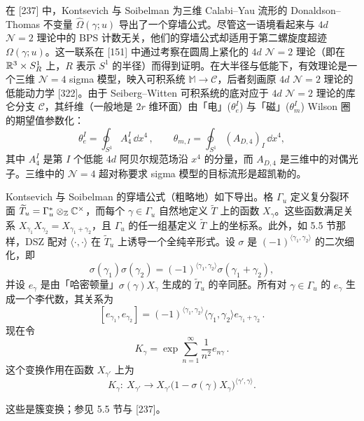 在 [237] 中，Kontsevich 与 Soibelman 为三维 Calabi–Yau 流形的 Donaldson–Thomas 不变量 $\widehat{\Omega}(\gamma;u)$ 导出了一个穿墙公式。尽管这一语境看起来与 $4d$ $\mathcal{N}=2$ 理论中的 BPS 计数无关，他们的穿墙公式却适用于第二螺旋度超迹 $\Omega(\gamma;u)$。这一联系在 [151] 中通过考察在圆周上紧化的 $4d$ $\mathcal{N}=2$ 理论（即在 $\mathbb{R}^3\times S^1_R$ 上，$R$ 表示 $S^1$ 的半径）而得到证明。在大半径与低能下，有效理论是一个三维 $\mathcal{N}=4$ sigma 模型，映入可积系统 $\mathbb{M}\to\mathcal{C}$，后者刻画原 $4d$ $\mathcal{N}=2$ 理论的低能动力学 [322]。由于 Seiberg–Witten 可积系统的底对应于 $4d$ $\mathcal{N}=2$ 理论的库仑分支 $\mathcal{C}$，其纤维（一般地是 $2r$ 维环面）由「电」($\theta_e^I$) 与「磁」($\theta_m^I$) Wilson 圈的期望值参数化：
\[
\theta_e^I=\oint_{S^1}A^I_4\,\dd x^4\,,\qquad \theta_{m,I}=\oint_{S^1}(A_{D,4})_I\,\dd x^4,
\]
其中 $A^I_4$ 是第 $I$ 个低能 $4d$ 阿贝尔规范场沿 $x^4$ 的分量，而 $A_{D,4}$ 是三维中的对偶光子。三维中的 $\mathcal{N}=4$ 超对称要求 sigma 模型的目标流形是超凯勒的。

Kontsevich 与 Soibelman 的穿墙公式（粗略地）如下导出。格 $\Gamma_u$ 定义复分裂环面 $\widetilde{T}_u=\Gamma_u^*\otimes_{\mathbb{Z}}\mathbb{C}^\times$，而每个 $\gamma\in\Gamma_u$ 自然地定义 $\widetilde{T}$ 上的函数 $X_\gamma$。这些函数满足关系 $X_{\gamma_1}X_{\gamma_2}=X_{\gamma_1+\gamma_2}$，且 $\Gamma_u$ 的任一组基定义 $\widetilde{T}$ 上的坐标系。此外，如 5.5 节那样，DSZ 配对 $\langle\cdot,\cdot\rangle$ 在 $\widetilde{T}_u$ 上诱导一个全纯辛形式。设 $\sigma$ 是 $(-1)^{\langle\gamma_1,\gamma_2\rangle}$ 的二次细化，即
\[
\sigma(\gamma_1)\sigma(\gamma_2)=(-1)^{\langle\gamma_1,\gamma_2\rangle}\sigma(\gamma_1+\gamma_2),
\]
并设 $e_\gamma$ 是由「哈密顿量」$\sigma(\gamma)X_\gamma$ 生成的 $\widetilde{T}_u$ 的辛同胚。所有对 $\gamma\in\Gamma_u$ 的 $e_\gamma$ 生成一个李代数，其关系为
\[
[e_{\gamma_1},e_{\gamma_2}]=(-1)^{\langle\gamma_1,\gamma_2\rangle}\langle\gamma_1,\gamma_2\rangle e_{\gamma_1+\gamma_2}\,.
\]
现在令
\[
K_\gamma=\exp\sum_{n=1}^{\infty}\frac{1}{n^2}e_{n\gamma}\,.
\]
这个变换作用在函数 $X_{\gamma'}$ 上为
\begin{equation}
K_\gamma:\ X_{\gamma'}\longrightarrow X_{\gamma'}\big(1-\sigma(\gamma)X_\gamma\big)^{\langle\gamma',\gamma\rangle}.\tag{22.8}
\end{equation}

\begin{remark}[22.11]
这些是簇变换；参见 5.5 节与 [237]。
\end{remark}


